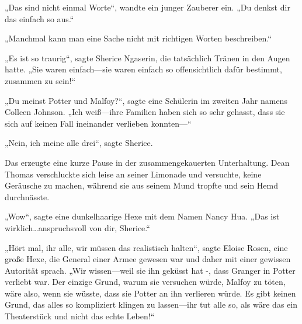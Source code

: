„Das sind nicht einmal Worte“, wandte ein junger Zauberer ein. „Du denkst dir das einfach so aus.“

„Manchmal kann man eine Sache nicht mit richtigen Worten beschreiben.“

„Es ist so traurig“, sagte Sherice Ngaserin, die tatsächlich Tränen in den Augen hatte. „Sie waren einfach—sie waren einfach so offensichtlich dafür bestimmt, zusammen zu sein!“

„Du meinst Potter und Malfoy?“, sagte eine Schülerin im zweiten Jahr namens Colleen Johnson. „Ich weiß—ihre Familien haben sich so sehr gehasst, dass sie sich auf keinen Fall ineinander verlieben konnten—“

„Nein, ich meine alle drei“, sagte Sherice.

Das erzeugte eine kurze Pause in der zusammengekauerten Unterhaltung. Dean Thomas verschluckte sich leise an seiner Limonade und versuchte, keine Geräusche zu machen, während sie aus seinem Mund tropfte und sein Hemd durchnässte.

„Wow“, sagte eine dunkelhaarige Hexe mit dem Namen Nancy Hua. „Das ist wirklich…anspruchsvoll von dir, Sherice.“

„Hört mal, ihr alle, wir müssen das realistisch halten“, sagte Eloise Rosen, eine große Hexe, die General einer Armee gewesen war und daher mit einer gewissen Autorität sprach. „Wir wissen—weil sie ihn geküsst hat -, dass Granger in Potter verliebt war. Der einzige Grund, warum sie versuchen würde, Malfoy zu töten, wäre also, wenn sie wüsste, dass sie Potter an ihn verlieren würde. Es gibt keinen Grund, das alles so kompliziert klingen zu lassen—ihr tut alle so, als wäre das ein Theaterstück und nicht das echte Leben!“

